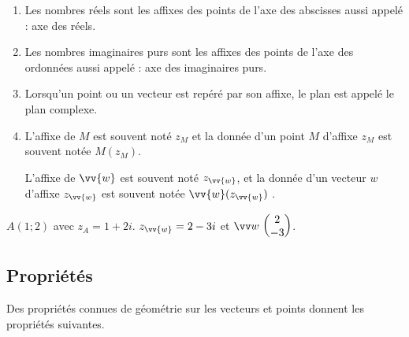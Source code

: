 \documentclass[10pt,a4paper]{article}
\begin{document}
\medskip

\rems
\begin{enumerate}[$\bullet$]
\item Les nombres réels sont les affixes des points de l'axe des abscisses aussi appelé : axe des réels.
\item Les nombres imaginaires purs sont les affixes des points de l'axe des ordonnées aussi appelé : axe des imaginaires purs.
\item Lorsqu'un point ou un vecteur est repéré par son affixe, le plan est appelé le plan complexe.
\item L'affixe de $M$ est souvent noté $z_M$ et la donnée d'un point $M$ d'affixe $z_M$ est souvent notée $M(z_M)$.

L'affixe de $\vv{w}$ est souvent noté $z_{\vv{w}}$, et la donnée d'un vecteur $w$ d'affixe $z_{\vv{w}}$ est souvent notée 
$ \vv{w}(z_{\vv{w}})$ .

\end{enumerate}

\exes $A(1;2)$ avec $z_A=1+2i$. $z_{\vv{w}}=2-3i$ et $\Coord{w}{2}{-3}$.


\subsection{Propriétés}

Des propriétés connues de géométrie sur les vecteurs et points donnent les propriétés suivantes.

\end{document}
